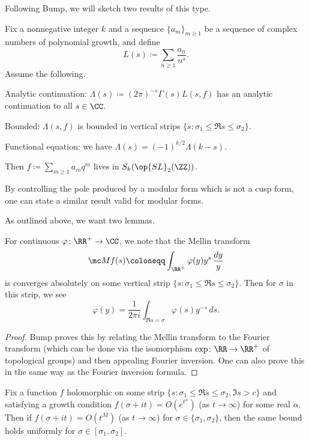 \documentclass{article}
\begin{document}
Following Bump, we will sketch two results of this type.
\begin{theorem} \label{thm:hecke-converse}
	Fix a nonnegative integer $k$ and a sequence $\{a_m\}_{m\ge1}$ be a sequence of complex numbers of polynomial growth, and define
	\[L(s)\coloneqq\sum_{n\ge1}\frac{a_n}{n^s}.\]
	Assume the following.
	\begin{listalph}
		\item Analytic continuation: $\Lambda(s)\coloneqq(2\pi)^{-s}\Gamma(s)L(s,f)$ has an analytic continuation to all $s\in\CC$.
		\item Bounded: $\Lambda(s,f)$ is bounded in vertical strips $\{s:\sigma_1\le\Re s\le\sigma_2\}$.
		\item Functional equation: we have $\Lambda(s)=(-1)^{k/2}\Lambda(k-s)$.
	\end{listalph}
	Then $f\coloneqq\sum_{m\ge1}a_mq^m$ lives in $S_k(\op{SL}_2(\ZZ))$.
\end{theorem}
\begin{remark}
	By controlling the pole produced by a modular form which is not a cusp form, one can state a similar result valid for modular forms.
\end{remark}
As outlined above, we want two lemmas.
\begin{lemma} \label{lem:mellin-inversion}
	For continuous $\varphi\colon\RR^+\to\CC$, we note that the Mellin transform
	\[\mc Mf(s)\coloneqq\int_{\RR^+}\varphi(y)y^s\,\frac{dy}y\]
	is converges absolutely on some vertical strip $\{s:\sigma_1\le\Re s\le\sigma_2\}$. Then for $\sigma$ in this strip, we see
	\[\varphi(y)=\frac1{2\pi i}\int_{\Re s=\sigma}\varphi(s)y^{-s}\,ds.\]
\end{lemma}
\begin{proof}
	Bump proves this by relating the Mellin transform to the Fourier transform (which can be done via the isomorphism $\exp\colon\RR\to\RR^+$ of topological groups) and then appealing Fourier inversion. One can also prove this in the same way as the Fourier inversion formula.
\end{proof}
\begin{lemma} \label{lem:pl-principle}
	Fix a function $f$ holomorphic on some strip $\{s:\sigma_1\le\Re s\le\sigma_2,\Im s>c\}$ and satisfying a growth condition $f(\sigma+it)=O\left(e^{t^\alpha}\right)$ (as $t\to\infty$) for some real $\alpha$. Then if $f(\sigma+it)=O\left(t^M\right)$ (as $t\to\infty$) for $\sigma\in\{\sigma_1,\sigma_2\}$, then the same bound holds uniformly for $\sigma\in[\sigma_1,\sigma_2]$.
\end{lemma}
\end{document}

